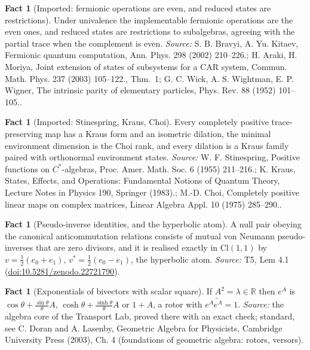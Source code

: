 \documentclass[11pt]{article}
\theoremstyle{definition}
\newtheorem{fact}[theorem]{Fact}
\theoremstyle{plain}
\providecommand{\Cl}{}\renewcommand{\Cl}{\mathrm{Cl}}
\providecommand{\R}{}\renewcommand{\R}{\mathbb{R}}
\begin{document}
\begin{fact}[Imported: fermionic operations are even, and reduced states are restrictions]\label{c:descent-lift.imported-fermionic-operations-are-even-reduced}
Under univalence the implementable fermionic operations are the even ones, and reduced states are restrictions to subalgebras, agreeing with the partial trace when the complement is even.
\emph{Source:} S. B. Bravyi, A. Yu. Kitaev, Fermionic quantum computation, Ann. Phys. 298 (2002) 210--226.; H. Araki, H. Moriya, Joint extension of states of subsystems for a CAR system, Commun. Math. Phys. 237 (2003) 105--122., Thm.~1; G. C. Wick, A. S. Wightman, E. P. Wigner, The intrinsic parity of elementary particles, Phys. Rev. 88 (1952) 101--105..
\end{fact}

\begin{fact}[Imported: Stinespring, Kraus, Choi]\label{c:descent-lift.imported-stinespring-kraus-choi}
Every completely positive trace-preserving map has a Kraus form and an isometric dilation, the minimal environment dimension is the Choi rank, and every dilation is a Kraus family paired with orthonormal environment states.
\emph{Source:} W. F. Stinespring, Positive functions on $C^*$-algebras, Proc. Amer. Math. Soc. 6 (1955) 211--216.; K. Kraus, States, Effects, and Operations: Fundamental Notions of Quantum Theory, Lecture Notes in Physics 190, Springer (1983).; M.-D. Choi, Completely positive linear maps on complex matrices, Linear Algebra Appl. 10 (1975) 285--290..
\end{fact}

\begin{fact}[Pseudo-inverse identities, and the hyperbolic atom]\label{c:singularity.pseudo-inverse-identities-hyperbolic-atom}
A null pair obeying the canonical anticommutation relations consists of mutual von Neumann pseudo-inverses that are zero divisors, and it is realised exactly in $\Cl(1,1)$ by $v = \tfrac12(e_0 + e_1)$, $v^* = \tfrac12(e_0 - e_1)$, the hyperbolic atom.
\emph{Source:} T5, Lem 4.1 (\href{https://doi.org/10.5281/zenodo.22721790}{doi:10.5281/zenodo.22721790}).
\end{fact}

\begin{fact}[Exponentials of bivectors with scalar square]\label{c:std-algebra.bivector-exponential}
If $A^{2} = \lambda \in \R$ then $e^{A}$ is $\cos\theta + \frac{\sin\theta}{\theta}A$, $\cosh\theta + \frac{\sinh\theta}{\theta}A$ or $1 + A$, a rotor with $e^{A}\widetilde{e^{A}} = 1$.
\emph{Source:} the algebra core of the Transport Lab, proved there with an exact check; standard, see C. Doran and A. Lasenby, Geometric Algebra for Physicists, Cambridge University Press (2003), Ch. 4 (foundations of geometric algebra: rotors, versors).
\end{fact}
\end{document}
